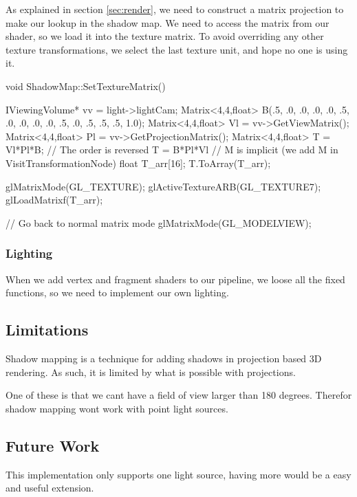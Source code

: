 As explained in section \ref{sec:render}, we need to construct a
matrix projection to make our lookup in the shadow map. We need to
access the matrix from our shader, so we load it into the texture
matrix. To avoid overriding any other texture transformations, we
select the last texture unit, and hope no one is using it.

\begin{cppcode}
  void ShadowMap::SetTextureMatrix() {    
    IViewingVolume* vv = light->lightCam;
    Matrix<4,4,float> B(.5, .0, .0,  .0,
                        .0, .5, .0,  .0,
                        .0, .0, .5,  .0,
                        .5, .5, .5, 1.0);
    Matrix<4,4,float> Vl = vv->GetViewMatrix();
    Matrix<4,4,float> Pl = vv->GetProjectionMatrix();    
    Matrix<4,4,float> T = Vl*Pl*B; // The order is reversed T = B*Pl*Vl 
                                   // M is implicit (we add M in VisitTransformationNode)
    float T_arr[16];
    T.ToArray(T_arr);

    glMatrixMode(GL_TEXTURE);
    glActiveTextureARB(GL_TEXTURE7);
    glLoadMatrixf(T_arr);

    // Go back to normal matrix mode
    glMatrixMode(GL_MODELVIEW);
}
\end{cppcode}



\subsubsection*{Lighting}

When we add vertex and fragment shaders to our pipeline, we loose all
the fixed functions, so we need to implement our own lighting.

\subsection{Limitations}

Shadow mapping is a technique for adding shadows in projection based 
3D rendering. As such, it is limited by what is possible with projections.

One of these is that we cant have a field of view larger than 180
degrees. Therefor shadow mapping wont work with point
light sources.

\subsection{Future Work}

This implementation only supports one light source, having more would
be a easy and useful extension.


